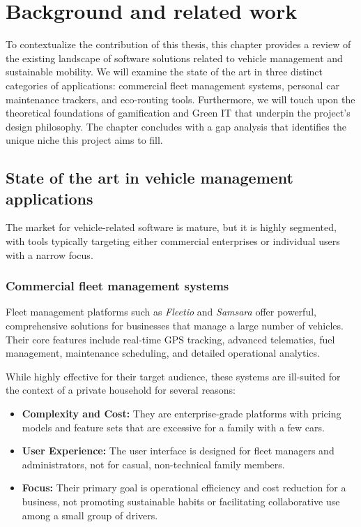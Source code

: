 \chapter{Background and related work}

To contextualize the contribution of this thesis, this chapter provides a review of the existing landscape of software solutions related to vehicle management and sustainable mobility. We will examine the state of the art in three distinct categories of applications: commercial fleet management systems, personal car maintenance trackers, and eco-routing tools. Furthermore, we will touch upon the theoretical foundations of gamification and Green IT that underpin the project's design philosophy. The chapter concludes with a gap analysis that identifies the unique niche this project aims to fill.

\section{State of the art in vehicle management applications}

The market for vehicle-related software is mature, but it is highly segmented, with tools typically targeting either commercial enterprises or individual users with a narrow focus.

\subsection{Commercial fleet management systems}
Fleet management platforms such as \textit{Fleetio} and \textit{Samsara} offer powerful, comprehensive solutions for businesses that manage a large number of vehicles. Their core features include real-time GPS tracking, advanced telematics, fuel management, maintenance scheduling, and detailed operational analytics.

\textgap

While highly effective for their target audience, these systems are ill-suited for the context of a private household for several reasons:
\begin{itemize}
    \item \textbf{Complexity and Cost:} They are enterprise-grade platforms with pricing models and feature sets that are excessive for a family with a few cars.
    \item \textbf{User Experience:} The user interface is designed for fleet managers and administrators, not for casual, non-technical family members.
    \item \textbf{Focus:} Their primary goal is operational efficiency and cost reduction for a business, not promoting sustainable habits or facilitating collaborative use among a small group of drivers.
\end{itemize}


